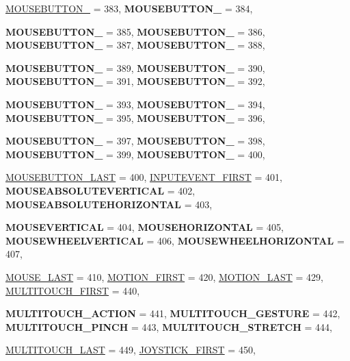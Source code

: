 \begin{DoxyCompactItemize}
\hyperlink{classphys_1_1MetaCode_a3e501cbb5bf0f6f1fdb7211465bda8d8a0ae247793a772d53d3dd6b4c84fef69d}{MOUSEBUTTON\_} =  383, 
{\bfseries MOUSEBUTTON\_} =  384, 
\par
{\bfseries MOUSEBUTTON\_} =  385, 
{\bfseries MOUSEBUTTON\_} =  386, 
{\bfseries MOUSEBUTTON\_} =  387, 
{\bfseries MOUSEBUTTON\_} =  388, 
\par
{\bfseries MOUSEBUTTON\_} =  389, 
{\bfseries MOUSEBUTTON\_} =  390, 
{\bfseries MOUSEBUTTON\_} =  391, 
{\bfseries MOUSEBUTTON\_} =  392, 
\par
{\bfseries MOUSEBUTTON\_} =  393, 
{\bfseries MOUSEBUTTON\_} =  394, 
{\bfseries MOUSEBUTTON\_} =  395, 
{\bfseries MOUSEBUTTON\_} =  396, 
\par
{\bfseries MOUSEBUTTON\_} =  397, 
{\bfseries MOUSEBUTTON\_} =  398, 
{\bfseries MOUSEBUTTON\_} =  399, 
{\bfseries MOUSEBUTTON\_} =  400, 
\par
\hyperlink{classphys_1_1MetaCode_a3e501cbb5bf0f6f1fdb7211465bda8d8afb041b448e08ff29bccec2349fbec97b}{MOUSEBUTTON\_\-LAST} =  400, 
\hyperlink{classphys_1_1MetaCode_a3e501cbb5bf0f6f1fdb7211465bda8d8a87685f9ca9462b329f2b86a17514f136}{INPUTEVENT\_\-FIRST} =  401, 
{\bfseries MOUSEABSOLUTEVERTICAL} =  402, 
{\bfseries MOUSEABSOLUTEHORIZONTAL} =  403, 
\par
{\bfseries MOUSEVERTICAL} =  404, 
{\bfseries MOUSEHORIZONTAL} =  405, 
{\bfseries MOUSEWHEELVERTICAL} =  406, 
{\bfseries MOUSEWHEELHORIZONTAL} =  407, 
\par
\hyperlink{classphys_1_1MetaCode_a3e501cbb5bf0f6f1fdb7211465bda8d8aeb3dc7f5f5d3e0948ebbe5c319760897}{MOUSE\_\-LAST} =  410, 
\hyperlink{classphys_1_1MetaCode_a3e501cbb5bf0f6f1fdb7211465bda8d8a355649b334e903ada2496ad39dcd5f9d}{MOTION\_\-FIRST} =  420, 
\hyperlink{classphys_1_1MetaCode_a3e501cbb5bf0f6f1fdb7211465bda8d8a59cc92f5b2f42f7a138f8ea22e92d626}{MOTION\_\-LAST} =  429, 
\hyperlink{classphys_1_1MetaCode_a3e501cbb5bf0f6f1fdb7211465bda8d8acdb03d23d93022d5962db5026475b9c7}{MULTITOUCH\_\-FIRST} =  440, 
\par
{\bfseries MULTITOUCH\_\-ACTION} =  441, 
{\bfseries MULTITOUCH\_\-GESTURE} =  442, 
{\bfseries MULTITOUCH\_\-PINCH} =  443, 
{\bfseries MULTITOUCH\_\-STRETCH} =  444, 
\par
\hyperlink{classphys_1_1MetaCode_a3e501cbb5bf0f6f1fdb7211465bda8d8a74243856f76001ba95b32cc575af3255}{MULTITOUCH\_\-LAST} =  449, 
\hyperlink{classphys_1_1MetaCode_a3e501cbb5bf0f6f1fdb7211465bda8d8a666e564cae666de739b9b3cf047ec578}{JOYSTICK\_\-FIRST} =  450, 

\end{DoxyCompactItemize}
